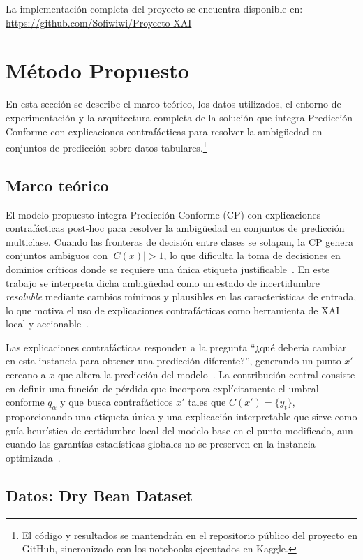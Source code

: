 \documentclass[conference]{IEEEtran}
\begin{document}
La implementación completa del proyecto se encuentra disponible en:
\url{https://github.com/Sofiwiwi/Proyecto-XAI}

\section{Método Propuesto}

En esta sección se describe el marco teórico, los datos utilizados, el
entorno de experimentación y la arquitectura completa de la solución que
integra Predicción Conforme con explicaciones contrafácticas para resolver
la ambigüedad en conjuntos de predicción sobre datos tabulares.\footnote{El
código y resultados se mantendrán en el repositorio público del proyecto
en GitHub, sincronizado con los notebooks ejecutados en Kaggle.}

\subsection{Marco teórico}

El modelo propuesto integra Predicción Conforme (CP) con explicaciones
contrafácticas post-hoc para resolver la ambigüedad en conjuntos de
predicción multiclase. Cuando las fronteras de decisión entre clases se
solapan, la CP genera conjuntos ambiguos con $|C(x)|>1$, lo que dificulta
la toma de decisiones en dominios críticos donde se requiere una única
etiqueta justificable~\cite{b1}. En este trabajo se interpreta dicha
ambigüedad como un estado de incertidumbre \emph{resoluble} mediante
cambios mínimos y plausibles en las características de entrada, lo que
motiva el uso de explicaciones contrafácticas como herramienta de XAI
local y accionable~\cite{b4,b7}.

Las explicaciones contrafácticas responden a la pregunta ``¿qué debería
cambiar en esta instancia para obtener una predicción diferente?'',
generando un punto $x'$ cercano a $x$ que altera la predicción del
modelo~\cite{b4}. La contribución central consiste en definir una función
de pérdida que incorpora explícitamente el umbral conforme $q_\alpha$ y
que busca contrafácticos $x'$ tales que $C(x') = \{y_t\}$, proporcionando
una etiqueta única y una explicación interpretable que sirve como guía
heurística de certidumbre local del modelo base en el punto modificado,
aun cuando las garantías estadísticas globales no se preserven en la
instancia optimizada~\cite{b1,b6}.

\subsection{Datos: Dry Bean Dataset}
\label{sec:datos}
\end{document}
